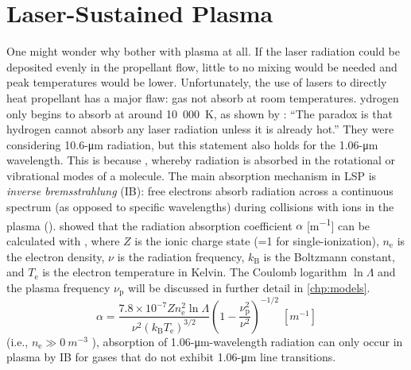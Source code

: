     \section{Laser-Sustained Plasma} \label{sec:background_lsp}
        One might wonder why bother with plasma at all. If the laser radiation could be deposited evenly in the propellant flow, little to no mixing would be needed and peak temperatures would be lower. Unfortunately, the use of lasers to directly heat  propellant has a major flaw:  gas  not absorb  at room temperatures. ydrogen only begins to absorb  at around 10~000~K, as shown by \textcite{glumbConceptsStatusLasersupported1984}: ``The paradox is that hydrogen cannot absorb any laser radiation unless it is already hot.'' They were considering 10.6-\unit{\um} radiation, but this statement also holds for the 1.06-\unit{\um} wavelength. This is because , whereby radiation is absorbed in the rotational or vibrational modes of a molecule. The main absorption mechanism in LSP is \emph{inverse bremsstrahlung} (IB): free electrons absorb radiation across a continuous spectrum (as opposed to specific wavelengths) during collisions with ions in the plasma (\textcite{keeferLaserSustainedPlasmas1989}). \textcite{johnstonCorrectValuesHighfrequency1973} showed that the radiation absorption coefficient $\alpha$ [\unit{m^{-1}}] can be calculated with , where $Z$ is the ionic charge state (=1 for single-ionization), $n_\mathrm{e}$ is the electron density, $\nu$ is the radiation frequency, $k_\mathrm{B}$ is the Boltzmann constant, and $T_\mathrm{e}$ is the electron temperature in Kelvin. The Coulomb logarithm $\ln{\Lambda}$ and the plasma frequency $\nu_\mathrm{p}$ will be discussed in further detail in \autoref{chp:models}.
        \newcommand{\ibalphaeq}{
            \alpha = \frac{7.8\times 10^{-7}Zn_\mathrm{e}^2\ln{\Lambda}}{\nu^2(k_\mathrm{B}T_\mathrm{e})^{3/2}} \left(1-\frac{\nu_\mathrm{p}^2}{\nu^2}\right)^{-1/2}\;[\unit{m^{-1}}]
        }
        \begin{equation}
            \ibalphaeq \label{eq:ib_absorption}
        \end{equation}
         (i.e., $n_\mathrm{e} \gg \qty{0}{m^{-3}}$ ), absorption of 1.06-\unit{\um}-wavelength radiation can only occur in plasma by IB for gases that do not exhibit 1.06-\unit{\um} line transitions.

